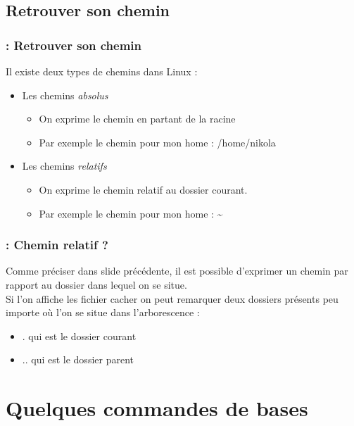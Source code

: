 \documentclass[13pt]{beamer}
\newenvironment{slide}[1]{
  \begin{frame}[environment=slide]
    \frametitle{\textbf{\insertsection}  : #1}}
{\end{frame}}
\begin{document}
\subsection{Retrouver son chemin}

\begin{slide}{Retrouver son chemin}
  Il existe deux types de chemins dans Linux :
  \begin{itemize}
  \item Les chemins \textit{absolus}
    \begin{itemize}
    \item On exprime le chemin en partant de la racine
    \item Par exemple le chemin pour mon home : /home/nikola
    \end{itemize}
  \item Les chemins \textit{relatifs}
    \begin{itemize}
    \item On exprime le chemin relatif au dossier courant.
    \item Par exemple le chemin pour mon home : \textasciitilde
    \end{itemize}
  \end{itemize}
\end{slide}

\begin{slide}{Chemin relatif ?}
  Comme préciser dans slide précédente, il est possible d'exprimer un chemin par
  rapport au dossier dans lequel on se situe.\\

  Si l'on affiche les fichier cacher on peut remarquer deux dossiers présents
  peu importe où l'on se situe dans l'arborescence :
  \begin{itemize}
  \item . qui est le dossier courant
  \item .. qui est le dossier parent
  \end{itemize}
\end{slide}

\section{Quelques commandes de bases}
\end{document}
